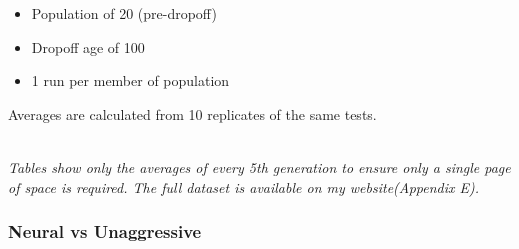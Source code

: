 \documentclass[12pt,a4paper]{article}
\begin{document}
\begin{itemize}
	\item Population of 20 (pre-dropoff)
	\item Dropoff age of 100
	\item 1 run per member of population
\end{itemize}

Averages are calculated from 10 replicates of the same tests. \\\\

\begin{small}
	\textit{Tables show only the averages of every 5th generation to ensure only a single page of space is required. The full dataset is available on my website(Appendix E).}
\end{small}

\newpage
\subsubsection{Neural vs Unaggressive}
\end{document}
